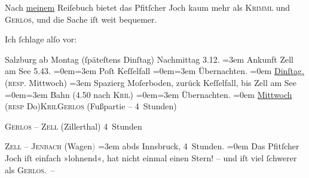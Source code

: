 \pstart
           Nach \uline{meinem} Reiſebuch bietet das Pfitſcher Joch kaum mehr als \textsc{Krimml} und \textsc{Gerlos}, und die Sache iſt weit bequemer.\pend
           
\pstart
           Ich{ }ſchlage alſo vor:\pend
           
\pstart
           Salzburg ab Montag (ſpäteſtens
                  Dinſtag) Nachmittag 3.12.\pend
           \leftskip=3em{}
\pstart
           \noindent{}{\pb}Ankunft Zell am See{ }5.43.\pend
           \leftskip=0em{}\leftskip=3em{}
\pstart
           Poſt Keſſelfall\pend
           \leftskip=0em{}\leftskip=3em{}
\pstart
           Übernachten.\pend
           \leftskip=0em{}
\pstart
           \uline{Dinſtag.} (\textsc{resp}. Mittwoch)\pend
           \leftskip=3em{}
\pstart
           \noindent{}Spazierg Moſerboden, zurück Keſſelfall, bis Zell am See\pend
           \leftskip=0em{}\leftskip=3em{}
\pstart
           Bahn (4.50 nach \textsc{Kri{\geminationm}l})\pend
           \leftskip=0em{}\leftskip=3em{}
\pstart
           Übernachten.\pend
           \leftskip=0em{}
\pstart
           \uline{Mittwoch}{ }\introOben{}(\textsc{resp}{ }Do{\geminationn})\introOben{}{ }\textsc{Kri{\geminationm}l}\textsc{Gerlos} (Fußpartie – 4 Stunden)\pend
           
\pstart
           \textsc{Gerlos} – \textsc{Zell} (Zillerthal) 4 Stunden\pend
           
\pstart
           \textsc{Zell – Jenbach} (Wagen\textcolor{gray}{)}\pend
           \leftskip=3em{}
\pstart
           \noindent{}abds{ }Innsbruck, 4 Stunden.\pend
           \leftskip=0em{}
\pstart
           {\pb}Das Pfitſcher
                  Joch iſt einfach »lohnend«, hat nicht einmal einen Stern! – und iſt
               viel{ }ſchwerer als \textsc{Gerlos}. –\pend
           
